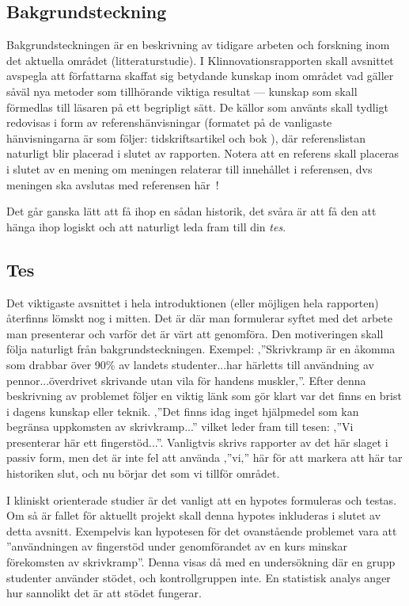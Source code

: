 \documentclass[twoside,twocolumn,9pt,a4paper]{IEEEtran}
\begin{document}
\subsection{Bakgrundsteckning}

Bakgrundsteckningen är en beskrivning av tidigare arbeten och forskning inom det aktuella området (litteraturstudie). I Klinnovationsrapporten skall avsnittet avspegla att författarna skaffat sig betydande kunskap inom området vad gäller såväl nya metoder som tillhörande viktiga resultat --- kunskap som skall förmedlas till läsaren på ett begripligt sätt. De källor som använts skall tydligt redovisas i form av referenshänvisningar (formatet på de vanligaste hänvisningarna är som följer: tidskriftsartikel \cite{Cavalcanti2004} och bok \cite{EEG_Silva}), där referenslistan naturligt blir placerad i slutet av rapporten. Notera att en referens skall placeras i slutet av en mening om meningen relaterar till innehållet i referensen, dvs meningen ska avslutas med referensen här~\cite{Cavalcanti2004}!

Det går ganska lätt att få ihop en sådan historik, det svåra är att få den att hänga ihop logiskt och att naturligt leda fram till din \textit{tes}.

\subsection{Tes}

Det viktigaste avsnittet i hela introduktionen (eller möjligen hela rapporten) återfinns lömskt nog i mitten. Det är där man formulerar syftet med det arbete man presenterar och varför det är värt att genomföra. Den motiveringen skall följa naturligt från bakgrundsteckningen. Exempel: ‚''Skrivkramp är en åkomma som drabbar över 90\% av landets studenter...har härletts till användning av pennor...överdrivet skrivande utan vila för handens muskler‚''. Efter denna beskrivning av problemet följer en viktig länk som gör klart var det finns en brist i dagens kunskap eller teknik. ‚''Det finns idag inget hjälpmedel som kan begränsa uppkomsten av skrivkramp...'' vilket leder fram till tesen: ‚''Vi presenterar här ett fingerstöd...''. Vanligtvis skrivs rapporter av det här slaget i passiv form, men det är inte fel att använda ‚''vi‚'' här för att markera att här tar historiken slut, och nu börjar det som vi tillför området.

I kliniskt orienterade studier är det vanligt att en hypotes formuleras och testas. Om så är fallet för aktuellt projekt skall denna hypotes inkluderas i slutet av detta avsnitt. Exempelvis kan hypotesen för det ovanstående problemet vara att ''användningen av fingerstöd under genomförandet av en kurs minskar förekomsten av skrivkramp''. Denna visas då med en undersökning där en grupp studenter använder stödet, och kontrollgruppen inte. En statistisk analys anger hur sannolikt det är att stödet fungerar. 
\end{document}
